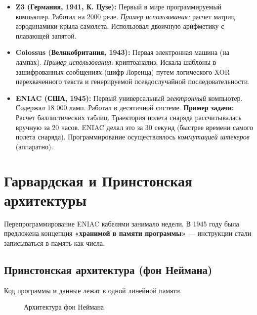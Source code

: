\documentclass[12pt,a4paper]{article}
\theoremstyle{remark}
\begin{document}
\begin{itemize}
    \item \textbf{Z3 (Германия, 1941, К. Цузе):} Первый в мире программируемый компьютер. Работал на 2000 реле. \textit{Пример использования:} расчет матриц аэродинамики крыла самолета. Использовал двоичную арифметику с плавающей запятой.
    \item \textbf{Colossus (Великобритания, 1943):} Первая электронная машина (на лампах). \textit{Пример использования:} криптоанализ. Искала шаблоны в зашифрованных сообщениях (шифр Лоренца) путем логического XOR перехваченного текста и генерируемой псевдослучайной последовательности.
    \item \textbf{ENIAC (США, 1945):} Первый универсальный \textit{электронный} компьютер. Содержал 18 000 ламп. Работал в десятичной системе.
    \textbf{Пример задачи:} Расчет баллистических таблиц. Траектория полета снаряда рассчитывалась вручную за 20 часов. ENIAC делал это за 30 секунд (быстрее времени самого полета снаряда). Программирование осуществлялось \textit{коммутацией штекеров} (аппаратно).
\end{itemize}

\section{Гарвардская и Принстонская архитектуры}
Перепрограммирование ENIAC кабелями занимало недели. В 1945 году была предложена концепция \textbf{«хранимой в памяти программы»} — инструкции стали записываться в память как числа.

\subsection{Принстонская архитектура (фон Неймана)}
Код программы и данные лежат в одной линейной памяти.

\begin{figure}[H]
    \centering
    \caption{Архитектура фон Неймана}
\end{figure}
\end{document}
